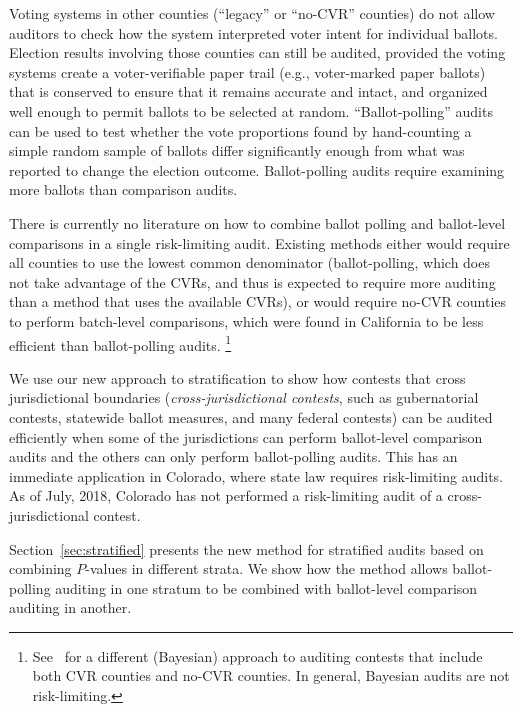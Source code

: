 \documentclass[runningheads]{llncs}
\begin{document}
Voting systems in other counties (``legacy'' or ``no-CVR'' counties) 
do not allow auditors to check how the system interpreted voter intent for individual ballots.
Election results involving those counties can still be audited, provided the voting systems
create a voter-verifiable paper trail (e.g., voter-marked paper ballots) that is
conserved to ensure that it remains accurate and intact, and organized well enough
to permit ballots to be selected at random.
``Ballot-polling'' audits \cite{lindemanEtal12,lindemanStark12} can be used to test whether the vote proportions 
found by hand-counting a simple random sample of ballots differ significantly enough from what was reported
to change the election outcome. 
Ballot-polling audits require examining more ballots than comparison audits.

There is currently no literature on how to combine
ballot polling and ballot-level comparisons in a single risk-limiting audit.
Existing methods either would require all counties to use the lowest
common denominator (ballot-polling, which does not take advantage of the CVRs,
and thus is expected to require more auditing than a method that uses the available CVRs),
 or would require no-CVR counties to perform batch-level comparisons, which were found in
California to be less efficient than ballot-polling audits\cite{CA_SOS_EAC}.%
\footnote{%
  See~\cite{Rivest-2018-bayesian-tabulation-audits}
  for a different (Bayesian) approach to auditing contests that include both CVR counties
  and no-CVR counties. In general, Bayesian audits are not risk-limiting.
}

We use our new approach to stratification to show
how contests that cross jurisdictional boundaries (\textit{cross-jurisdictional contests}, such as gubernatorial contests, statewide ballot measures, and
many federal contests) can be audited efficiently when some of the jurisdictions can perform ballot-level comparison audits
and the others can only perform ballot-polling audits.
This has an immediate application in Colorado, where state law requires
risk-limiting audits.
As of July, 2018, Colorado has not performed a risk-limiting audit of a cross-jurisdictional contest.

Section~\ref{sec:stratified} presents the new method for stratified audits
based on combining $P$-values in different strata.
We show how the method allows ballot-polling auditing in one 
stratum to be combined with ballot-level comparison auditing in another.
\end{document}
